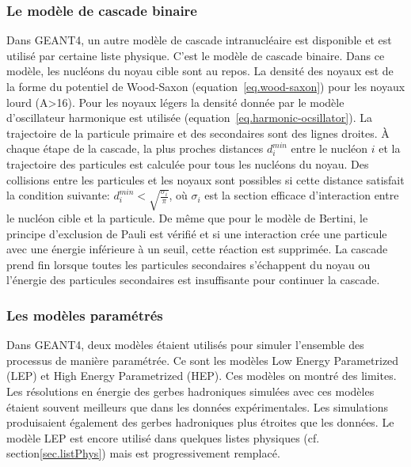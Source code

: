 \subsubsection{Le modèle de cascade binaire}
Dans GEANT4, un autre modèle de cascade intranucléaire est disponible et est utilisé par certaine liste physique. C'est le modèle de cascade binaire. Dans ce modèle, les nucléons du noyau cible sont au repos. La densité des noyaux est de la forme du potentiel de Wood-Saxon (equation~\ref{eq.wood-saxon}) pour les noyaux lourd (A>16). Pour les noyaux légers la densité donnée par le modèle d'oscillateur harmonique est utilisée (equation~\ref{eq.harmonic-ocsillator}). La trajectoire de la particule primaire et des secondaires sont des lignes droites. À chaque étape de la cascade, la plus proches distances $d_i^{min}$ entre le nucléon $i$ et la trajectoire des particules est calculée pour tous les nucléons du noyau. Des collisions entre les particules et les noyaux sont possibles si cette distance satisfait la condition suivante: $d_i^{min}<\sqrt{\frac{\sigma_i}{\pi}}$, où $\sigma_i$ est la section efficace d'interaction entre le nucléon cible et la particule. De même que pour le modèle de Bertini, le principe d'exclusion de Pauli est vérifié et si une interaction crée une particule avec une énergie inférieure à un seuil, cette réaction est supprimée. La cascade prend fin lorsque toutes les particules secondaires s'échappent du noyau ou l'énergie des particules secondaires est insuffisante pour continuer la cascade.

\subsubsection{Les modèles paramétrés}
Dans GEANT4, deux modèles étaient utilisés pour simuler l'ensemble des processus de manière paramétrée. Ce sont les modèles Low Energy Parametrized (LEP) et High Energy Parametrized (HEP). Ces modèles on montré des limites. Les résolutions en énergie des gerbes hadroniques simulées avec ces modèles étaient souvent meilleurs que dans les données expérimentales. Les simulations produisaient également des gerbes hadroniques plus étroites que les données. Le modèle LEP est encore utilisé dans quelques listes physiques (cf. section\ref{sec.listPhys}) mais est progressivement remplacé.
